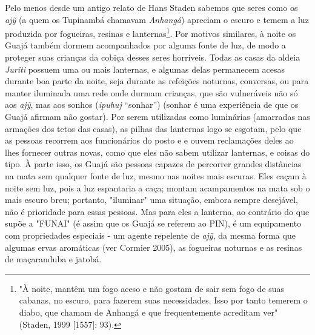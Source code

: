 Pelo menos desde um antigo relato de Hans Staden sabemos que seres como
os \emph{ajỹ} (a quem os Tupinambá chamavam \emph{Anhangá}) apreciam o
escuro e temem a luz produzida por fogueiras, resinas e
lanternas\footnote{"À noite, mantêm um fogo aceso e não gostam de sair
  sem fogo de suas cabanas, no escuro, para fazerem suas necessidades.
  Isso por tanto temerem o diabo, que chamam de Anhangá e que
  frequentemente acreditam ver" (Staden, 1999 {[}1557{]}: 93).}. Por
motivos similares, à noite os Guajá também dormem acompanhados por
alguma fonte de luz, de modo a proteger suas crianças da cobiça desses
seres horríveis. Todas as casas da aldeia \emph{Juriti} possuem uma ou
mais lanternas, e algumas delas permanecem acesas durante boa parte da
noite, seja durante as refeições noturnas, conversas, ou para manter
iluminada uma rede onde durmam crianças, que são vulneráveis não só aos
\emph{ajỹ}, mas aos sonhos (\emph{ipuhuj} ``sonhar'') (sonhar é uma
experiência de que os Guajá afirmam não gostar). Por serem utilizadas
como luminárias (amarradas nas armações dos tetos das casas), as pilhas
das lanternas logo se esgotam, pelo que as pessoas recorrem aos
funcionários do posto e e ouvem reclamações deles ao lhes fornecer
outras novas, como que eles não sabem utilizar lanternas, e coisas do
tipo. À parte isso, os Guajá são pessoas capazes de percorrer grandes
distâncias na mata sem qualquer fonte de luz, mesmo nas noites mais
escuras. Eles caçam à noite sem luz, pois a luz espantaria a caça;
montam acampamentos na mata sob o mais escuro breu; portanto, "iluminar"
uma situação, embora sempre desejável, não é prioridade para essas
pessoas. Mas para eles a lanterna, ao contrário do que supõe a "FUNAI"
(é assim que os Guajá se referem ao PIN), é um equipamento com
propriedades especiais - um agente repelente de \emph{ajỹ}, da mesma
forma que algumas ervas aromáticas (ver Cormier 2005), as fogueiras
noturnas e as resinas de maçaranduba e jatobá.

